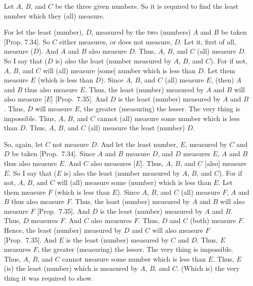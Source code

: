 \begin{Parallel}{}{}
{Let $A$, $B$, and $C$ be the three given numbers. So it is required to
find the least number which they (all) measure.

\epsfysize=1.8in
\centerline{}

For let the least (number), $D$, measured by the two (numbers) $A$ and $B$
be taken [Prop. 7.34].
So $C$ either measures, or does not measure, $D$. Let it, first of
all, measure ($D$). And $A$ and $B$ also measure $D$. Thus, $A$, $B$, and $C$
(all) measure $D$. So I say that ($D$ is) also the least (number measured by
$A$, $B$, and $C$). For if not, $A$, $B$, and $C$ will (all) measure [some]
number which is less than $D$. Let them measure $E$ (which is less than $D$).
Since $A$, $B$, and $C$ (all) measure $E$, (then) $A$ and $B$ thus also measure $E$.
Thus, the least (number) measured by $A$ and $B$ will also
measure [$E$] [Prop.~7.35]. And $D$
is the least (number) measured by $A$ and $B$. Thus, $D$ will measure
$E$, the greater (measuring) the lesser. The very thing is impossible.
Thus, $A$, $B$, and $C$ cannot (all) measure some number which is less than $D$.
Thus, $A$, $B$, and $C$ (all) measure the least (number) $D$.

So, again, let $C$ not measure $D$. And let the least number, $E$, measured
by $C$ and $D$ be taken [Prop.~7.34].
Since $A$ and $B$ measure $D$, and $D$ measures $E$, $A$ and $B$ thus also
measure $E$. And $C$ also measures [$E$]. Thus, $A$, $B$, and $C$ [also] measure
$E$. So I say that ($E$ is) also the least (number measured by $A$, $B$, and $C$). For if not, $A$, $B$, and $C$ will (all) measure some (number) which
is less than $E$. Let them measure $F$ (which is less than $E$). Since
$A$, $B$, and $C$ (all) measure $F$, $A$ and $B$ thus also measure $F$. Thus,
the least (number) measured by $A$ and $B$ will also measure $F$  [Prop.~7.35]. And $D$ is the least (number) measured
by $A$ and $B$. Thus, $D$ measures $F$.  And $C$ also measures $F$. Thus, $D$ and $C$
(both) measure $F$. Hence, the least (number) measured by $D$ and $C$
will also measure $F$ [Prop.~7.35].
And $E$ is the least (number) measured by $C$ and $D$. Thus, $E$ measures $F$,
the greater (measuring) the lesser. The very thing is impossible.
Thus, $A$, $B$, and $C$ cannot measure some number which is less than $E$.
Thus, $E$ (is) the least (number) which is measured by $A$, $B$, and $C$.
(Which is) the very thing it was required to show.}
\end{Parallel}

